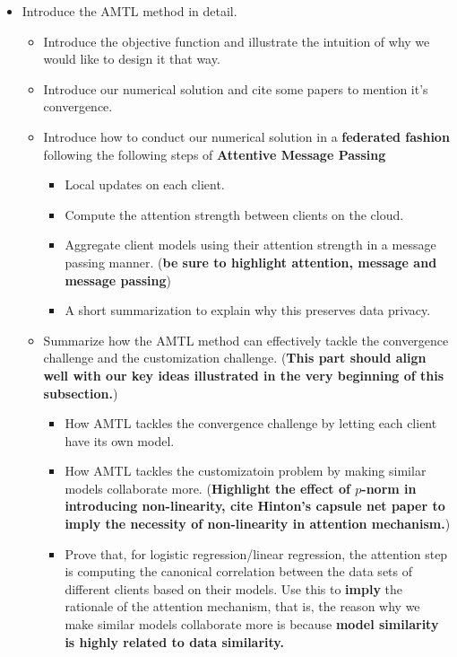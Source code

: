 {\begin{itemize}
    \item Introduce the AMTL method in detail.
    \begin{itemize}
        \item Introduce the objective function and illustrate the intuition of why we would like to design it that way.
        \item Introduce our numerical solution and cite some papers to mention it's convergence.
        \item Introduce how to conduct our numerical solution in a \textbf{federated fashion} following the following steps of \textbf{Attentive Message Passing}
        \begin{itemize}
            \item Local updates on each client.
            \item Compute the attention strength between clients on the cloud.
            \item Aggregate client models using their attention strength in a message passing manner. (\textbf{be sure to highlight attention, message and message passing})
            \item A short summarization to explain why this preserves data privacy.
        \end{itemize}
        \item Summarize how the AMTL method can effectively tackle the convergence challenge and the customization challenge. (\textbf{This part should align well with our key ideas illustrated in the very beginning of this subsection.})
        \begin{itemize}
            \item How AMTL tackles the convergence challenge by letting each client have its own model.
            \item How AMTL tackles the customizatoin problem by making similar models collaborate more. (\textbf{Highlight the effect of $p$-norm in introducing non-linearity, cite Hinton's capsule net paper to imply the necessity of non-linearity in attention mechanism.})
            \item Prove that, for logistic regression/linear regression, the attention step is computing the canonical correlation between the data sets of different clients based on their models. Use this to \textbf{imply} the rationale of the attention mechanism, that is, the reason why we make similar models collaborate more is because \textbf{model similarity is highly related to data similarity.}
        \end{itemize}
    \end{itemize}
\end{itemize}


}
